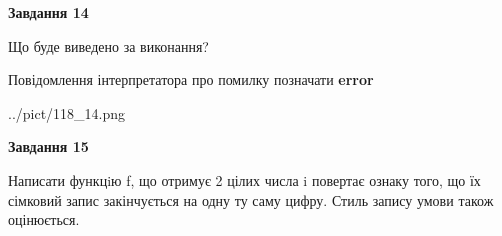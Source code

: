 \documentclass[11pt, ukrainian]{article}
\begin{document}
{\begin {large}
{\begin {center}\textbf{Завдання 14}\end {center}}\par
Що буде виведено за виконання? \par
Повідомлення інтерпретатора про помилку позначати \textbf{error}

\begin{center}
	{../pict/118_14.png}
\end{center}
\newpage

{\begin {center}\textbf{Завдання 15}\end {center}}\par

Написати функцiю f, що отримує 2 цілих числа i повертає ознаку того, що їх сімковий запис закінчується на одну ту саму цифру. Стиль запису умови також оцінюється.\par
\newpage

\end {large}}
\end{document}
